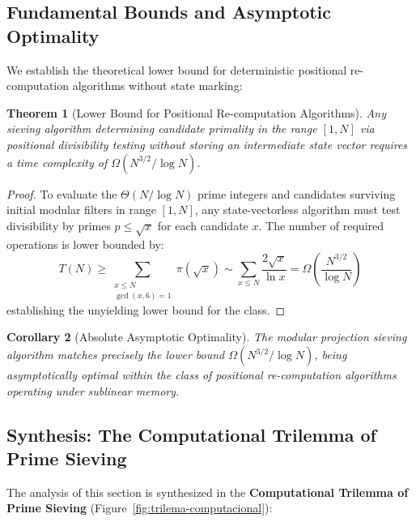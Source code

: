 \documentclass{article}
\numberwithin{equation}{section}
\theoremstyle{plain}
\newtheorem{theorem}{Theorem}[section]
\newtheorem{corollary}[theorem]{Corollary}
\theoremstyle{definition}
\begin{document}
\subsection{Fundamental Bounds and Asymptotic Optimality}

We establish the theoretical lower bound for deterministic positional re-computation algorithms without state marking:

\begin{theorem}[Lower Bound for Positional Re-computation Algorithms]
\label{thm:limite-inferior}
Any sieving algorithm determining candidate primality in the range $[1, N]$ via positional divisibility testing without storing an intermediate state vector requires a time complexity of $\Omega(N^{3/2}/\log N)$.
\end{theorem}

\begin{proof}
To evaluate the $\Theta(N/\log N)$ prime integers and candidates surviving initial modular filters in range $[1, N]$, any state-vectorless algorithm must test divisibility by primes $p \le \sqrt{x}$ for each candidate $x$. The number of required operations is lower bounded by:
\begin{equation}
T(N) \ge \sum_{\substack{x \le N \\ \gcd(x,6)=1}} \pi(\sqrt{x}) \sim \sum_{x \le N} \frac{2\sqrt{x}}{\ln x} = \Omega\left(\frac{N^{3/2}}{\log N}\right)
\end{equation}
establishing the unyielding lower bound for the class.
\end{proof}

\begin{corollary}[Absolute Asymptotic Optimality]
\label{cor:optimalidad-asintotica}
The modular projection sieving algorithm matches precisely the lower bound $\Omega(N^{3/2}/\log N)$, being asymptotically optimal within the class of positional re-computation algorithms operating under sublinear memory.
\end{corollary}

\subsection{Synthesis: The Computational Trilemma of Prime Sieving}

The analysis of this section is synthesized in the \textbf{Computational Trilemma of Prime Sieving} (Figure~\ref{fig:trilema-computacional}):
\end{document}
